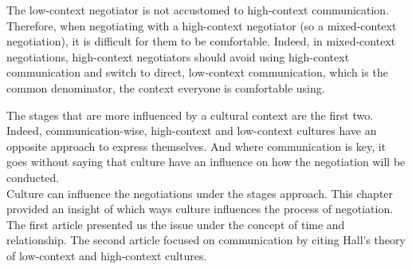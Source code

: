 \documentclass[../main.tex]{subfiles}
\begin{document}
The low-context negotiator is not accustomed to high-context communication. Therefore, when negotiating with a high-context negotiator (so a mixed-context negotiation), it is difficult for them to be comfortable. Indeed, in mixed-context negotiations, high-context negotiators should avoid using high-context communication and switch to direct, low-context communication, which is the common denominator, the context everyone is comfortable using.

The stages that are more influenced by a cultural context are the first two. Indeed, communication-wise, high-context and low-context cultures have an opposite approach to express themselves. And where communication is key, it goes without saying that culture have an influence on how the negotiation will be conducted.\\

Culture can influence the negotiations under the stages approach. This chapter provided an insight of which ways culture influences the process of negotiation. The first article presented us the issue under the concept of time and relationship. The second article focused on communication by citing Hall's theory of low-context and high-context cultures.
\end{document}
